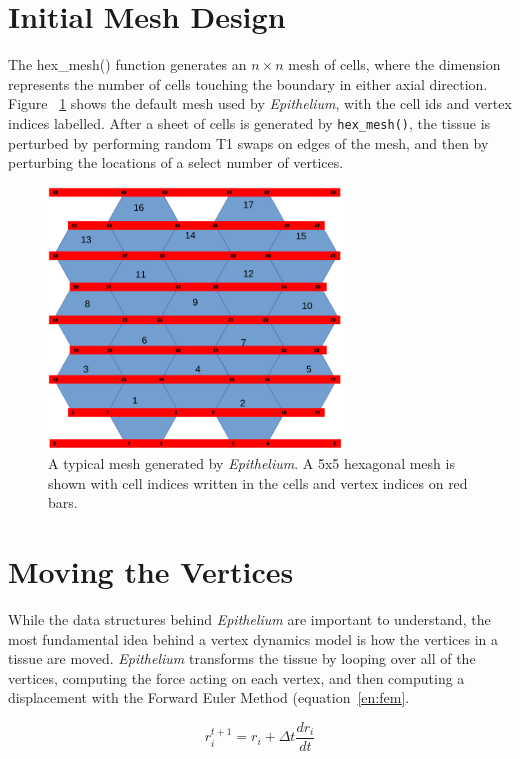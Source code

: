 \section{Initial Mesh Design}
The hex\_mesh() function generates an $n\times n$ mesh of cells, where the 
dimension represents the number of cells touching the boundary in 
either axial direction. Figure ~\ref{fig:mesh} shows the default mesh 
used by \emph{Epithelium}, with the cell ids and vertex indices labelled. After a sheet of cells is generated by 
\texttt{hex\_mesh()}, the tissue is perturbed by performing random 
T1 swaps on edges of the mesh, and then by perturbing the locations of a select 
number of vertices.

\begin{figure}
\centering
\includegraphics[width=0.7\textwidth]{../diagrams/vert_mesh.png}
\caption[A 5x5 Hexagonal Mesh.]{A typical mesh generated by \emph{Epithelium}. A 5x5 hexagonal mesh is shown with  
cell indices written in the cells and vertex indices on red bars.}
\label{fig:mesh}
\end{figure}

\section{Moving the Vertices}
While the data structures behind \emph{Epithelium} are important to understand, the most fundamental idea behind a vertex dynamics model is how the vertices in a tissue are moved.  \emph{Epithelium} transforms the tissue by looping over all of the vertices, computing the force acting on each vertex, and then computing a displacement with the Forward Euler Method (equation~\ref{en:fem}. 

\begin{equation}
\label{en:fem}
r_i^{t+1} = r_i + \Delta t\frac{dr_i}{dt}
\end{equation}

